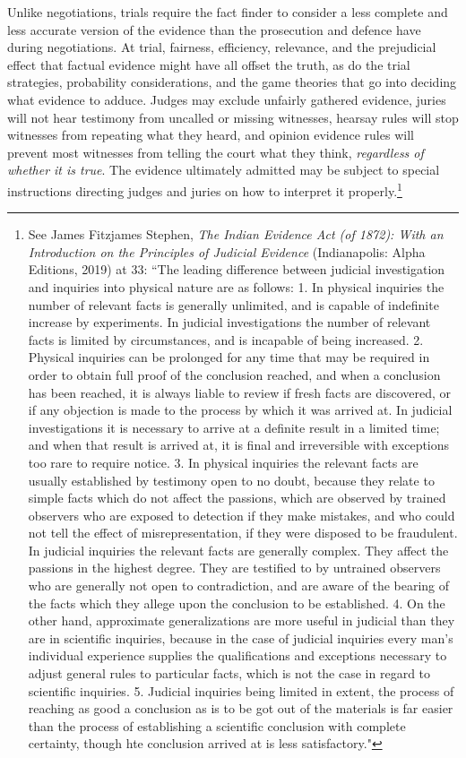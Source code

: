 Unlike negotiations, trials require the fact finder to consider a less complete and less accurate version of the evidence than the prosecution and defence have during negotiations. At trial, fairness, efficiency, relevance, and the prejudicial effect that factual evidence might have all offset the truth, as do the trial strategies, probability considerations, and the game theories that go into deciding what evidence to adduce. Judges may exclude unfairly gathered evidence, juries will not hear testimony from uncalled or missing witnesses, hearsay rules will stop witnesses from repeating what they heard, and opinion evidence rules will prevent most witnesses from telling the court what they think, \textit{regardless of whether it is true}. The evidence ultimately admitted may be subject to special instructions directing judges and juries on how to interpret it properly.\footnote{See James Fitzjames Stephen, \textit{The Indian Evidence Act (of 1872): With an Introduction on the Principles of Judicial Evidence} (Indianapolis: Alpha Editions, 2019) at 33: ``The leading difference between judicial investigation and inquiries into physical nature are as follows: 
1. In physical inquiries the number of relevant facts is generally unlimited, and is capable of indefinite increase by experiments. In judicial investigations the number of relevant facts is limited by circumstances, and is incapable of being increased.
2. Physical inquiries can be prolonged for any time that may be required in order to obtain full proof of the conclusion reached, and when a conclusion has been reached, it is always liable to review if fresh facts are discovered, or if any objection is made to the process by which it was arrived at. In judicial investigations it is necessary to arrive at a definite result in a limited time; and when that result is arrived at, it is final and irreversible with exceptions too rare to require notice.
3. In physical inquiries the relevant facts are usually established by testimony open to no doubt, because they relate to simple facts which do not affect the passions, which are observed by trained observers who are exposed to detection if they make mistakes, and who could not tell the effect of misrepresentation, if they were disposed to be fraudulent. In judicial inquiries the relevant facts are generally complex. They affect the passions in the highest degree. They are testified to by untrained observers who are generally not open to contradiction, and are aware of the bearing of the facts which they allege upon the conclusion to be established.
4. On the other hand, approximate generalizations are more useful in judicial than they are in scientific inquiries, because in the case of judicial inquiries every man's individual experience supplies the qualifications and exceptions necessary to adjust general rules to particular facts, which is not the case in regard to scientific inquiries.
5. Judicial inquiries being limited in extent, the process of reaching as good a conclusion as is to be got out of the materials is far easier than the process of establishing a scientific conclusion with complete certainty, though hte conclusion arrived at is less satisfactory."} 

